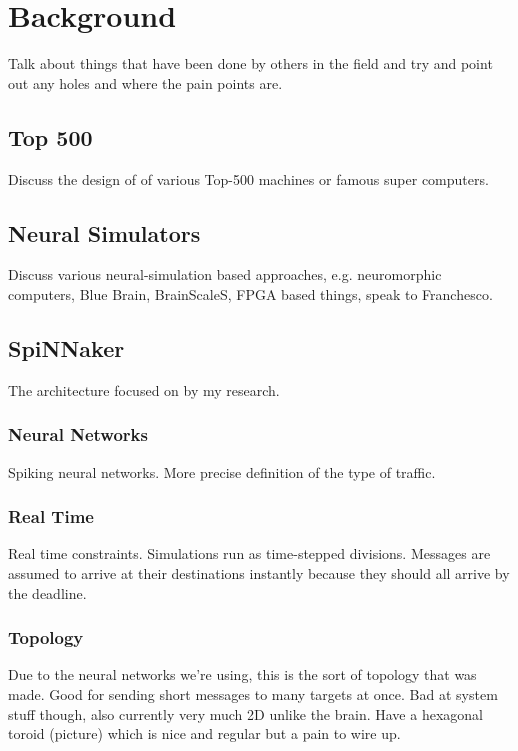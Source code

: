 \chapter{Background}
	\label{chap:background}
	
	Talk about things that have been done by others in the field and try and point
	out any holes and where the pain points are.
	
	\section{Top 500}
		
		Discuss the design of of various Top-500 machines or famous super computers.
	
	\section{Neural Simulators}
		
		Discuss various neural-simulation based approaches, e.g. neuromorphic
		computers, Blue Brain, BrainScaleS, FPGA based things, speak to Franchesco.
	
	\section{SpiNNaker}
		
		The architecture focused on by my research.
		
		\subsection{Neural Networks}
			
			Spiking neural networks. More precise definition of the type of traffic.
		
		\subsection{Real Time}
			
			Real time constraints. Simulations run as time-stepped divisions. Messages
			are assumed to arrive at their destinations instantly because they should
			all arrive by the deadline.
		
		\subsection{Topology}
			
			Due to the neural networks we're using, this is the sort of topology that
			was made. Good for sending short messages to many targets at once. Bad at
			system stuff though, also currently very much 2D unlike the brain. Have a
			hexagonal toroid (picture) which is nice and regular but a pain to wire up.
		
